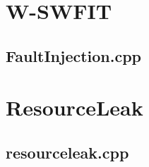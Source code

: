 
\chapter{W-SWFIT}
\section{FaultInjection.cpp} \label{app:w-swfit}


\chapter{ResourceLeak}
\section{resourceleak.cpp} \label{app:resourceLeak}


